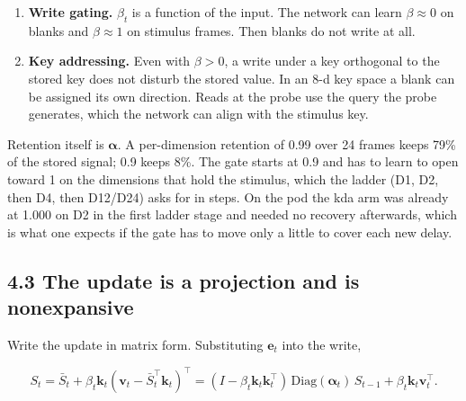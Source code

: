 \documentclass[

]{article}
\newcounter{none} %
\providecommand{\tightlist}{%

  \setlength{\itemsep}{0pt}\setlength{\parskip}{0pt}}
\begin{document}
\begin{enumerate}

\def\labelenumi{\arabic{enumi}.}

\tightlist

\item

  \textbf{Write gating.} \(\beta_t\) is a function of the input. The network can learn \(\beta\approx0\) on blanks and \(\beta\approx1\) on stimulus frames. Then blanks do not write at all.

\item

  \textbf{Key addressing.} Even with \(\beta>0\), a write under a key orthogonal to the stored key does not disturb the stored value. In an 8-d key space a blank can be assigned its own direction. Reads at the probe use the query the probe generates, which the network can align with the stimulus key.

\end{enumerate}



Retention itself is \(\boldsymbol\alpha\). A per-dimension retention of 0.99 over 24 frames keeps 79\% of the stored signal; 0.9 keeps 8\%. The gate starts at 0.9 and has to learn to open toward 1 on the dimensions that hold the stimulus, which the ladder (D1, D2, then D4, then D12/D24) asks for in steps. On the pod the kda arm was already at 1.000 on D2 in the first ladder stage and needed no recovery afterwards, which is what one expects if the gate has to move only a little to cover each new delay.



\subsection{4.3 The update is a projection and is nonexpansive}\label{the-update-is-a-projection-and-is-nonexpansive}



Write the update in matrix form. Substituting \(\mathbf{e}_t\) into the write,



\[

S_t=\bar S_t+\beta_t\mathbf{k}_t(\mathbf{v}_t-\bar S_t^\top\mathbf{k}_t)^\top

=(I-\beta_t\mathbf{k}_t\mathbf{k}_t^\top)\,\mathrm{Diag}(\boldsymbol\alpha_t)\,S_{t-1}+\beta_t\mathbf{k}_t\mathbf{v}_t^\top .

\]
\end{document}
